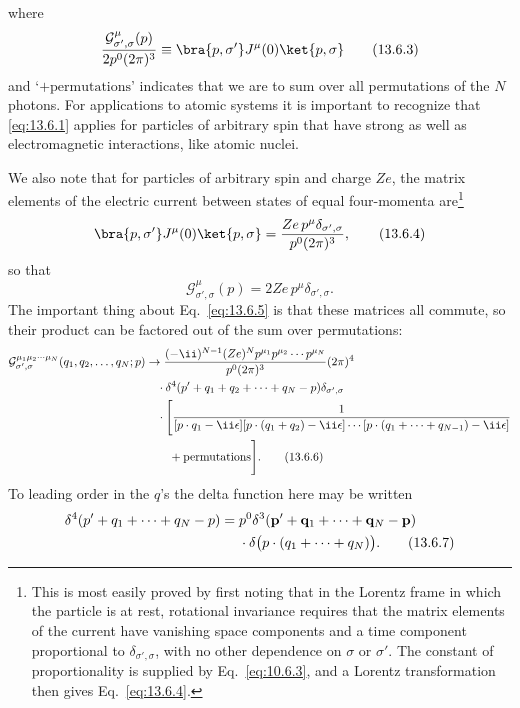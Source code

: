 where
\begin{equation}
\frac{\mathcal G^\mu_{\sigma',\sigma}(p)}{2p^0(2\pi)^3}
\equiv\bra{p,\sigma'}J^\mu(0)\ket{p,\sigma}
\tag{13.6.3}\label{eq:13.6.3}
\end{equation}
and `$+\text{permutations}$' indicates that we are to sum over all permutations
of the $N$ photons. For applications to atomic systems it is important
to recognize that \eqref{eq:13.6.1} applies for particles of arbitrary spin that have
strong as well as electromagnetic interactions, like atomic nuclei.

We also note that for particles of arbitrary spin and charge $Ze$, the
matrix elements of the electric current between states of equal four-momenta are\footnote{This is most easily proved by first noting that in the Lorentz frame in which the particle is at
rest, rotational invariance requires that the matrix elements of the current have vanishing space
components and a time component proportional to $\delta_{\sigma',\sigma}$, with no other dependence on $\sigma$ or $\sigma'$.
The constant of proportionality is supplied by Eq.~\eqref{eq:10.6.3}, and a Lorentz transformation then
gives Eq.~\eqref{eq:13.6.4}.}
\begin{equation}
\bra{p,\sigma'}J^\mu(0)\ket{p,\sigma}
=\frac{Ze\,p^\mu\delta_{\sigma',\sigma}}{p^0(2\pi)^3},
\tag{13.6.4}\label{eq:13.6.4}
\end{equation}
so that
\begin{equation}
\mathcal G^\mu_{\sigma',\sigma}(p)=2Ze\,p^\mu\delta_{\sigma',\sigma}.
\tag{13.6.5}\label{eq:13.6.5}
\end{equation}
The important thing about Eq.~\eqref{eq:13.6.5} is that these matrices all commute,
so their product can be factored out of the sum over permutations:
\begin{align}
\mathcal G^{\mu_1\mu_2\cdots\mu_N}_{\sigma',\sigma}
(q_1,q_2,\ldots,q_N;p)
&\to
\frac{(-\ii)^{N-1}(Ze)^N p^{\mu_1}p^{\mu_2}\cdots p^{\mu_N}}
{p^0(2\pi)^3}(2\pi)^4
\notag\\
&\quad\cdot
\delta^4(p'+q_1+q_2+\cdots+q_N-p)\delta_{\sigma',\sigma}
\notag\\
&\quad\cdot\Biggl[
\frac{1}{[p\cdot q_1-\ii\epsilon]
[p\cdot(q_1+q_2)-\ii\epsilon]\cdots
[p\cdot(q_1+\cdots+q_{N-1})-\ii\epsilon]}
\notag\\
&\qquad+\text{permutations}\Biggr].
\tag{13.6.6}\label{eq:13.6.6}
\end{align}
To leading order in the $q$'s the delta function here may be written
\begin{align}
\delta^4(p'+q_1+\cdots+q_N-p)={}&p^0
\delta^3(\mathbf p'+\mathbf q_1+\cdots+\mathbf q_N-\mathbf p)
\notag\\
&\cdot\delta\bigl(p\cdot(q_1+\cdots+q_N)\bigr).
\tag{13.6.7}\label{eq:13.6.7}
\end{align}
